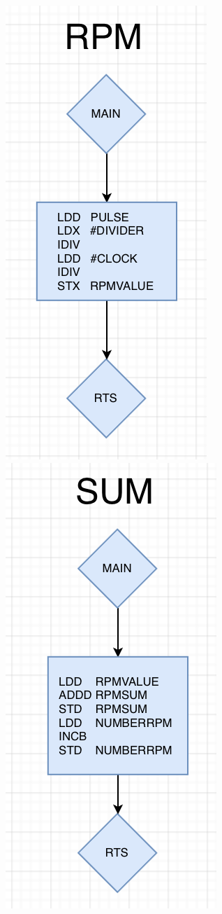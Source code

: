 \documentclass[12pt]{report}
\begin{document}
\begin{center}
     \includegraphics[scale=0.66]{rpm.PNG}
     \includegraphics[scale=0.66]{sum.PNG}

\end{center}
\end{document}
